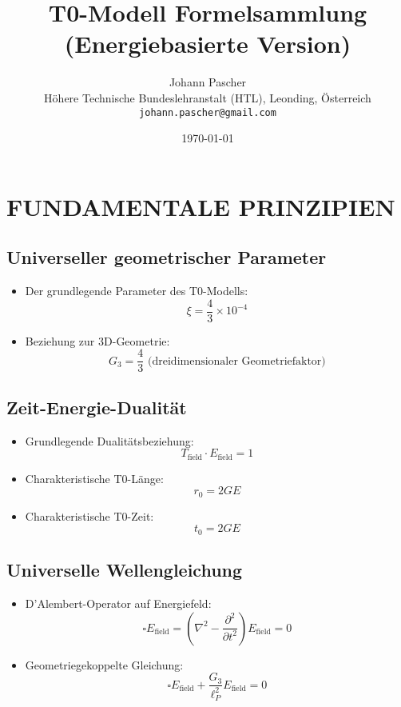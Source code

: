 \documentclass[12pt,a4paper]{article}
\title{T0-Modell Formelsammlung\\
	\large (Energiebasierte Version)}
\author{Johann Pascher\\
	\small H\"{o}here Technische Bundeslehranstalt (HTL), Leonding, \"{O}sterreich\\
	\small \texttt{johann.pascher@gmail.com}}
\date{\today}
\begin{document}
	
	\maketitle
	\tableofcontents
	\newpage
	
	\section{FUNDAMENTALE PRINZIPIEN}
	
	\subsection{Universeller geometrischer Parameter}
	\begin{itemize}
		\item Der grundlegende Parameter des T0-Modells:
		$$\xi = \frac{4}{3} \times 10^{-4}$$
		
		\item Beziehung zur 3D-Geometrie:
		$$G_3 = \frac{4}{3} \text{ (dreidimensionaler Geometriefaktor)}$$
	\end{itemize}
	
	\subsection{Zeit-Energie-Dualit\"{a}t}
	\begin{itemize}
		\item Grundlegende Dualit\"{a}tsbeziehung:
		$$T_{\text{field}} \cdot E_{\text{field}} = 1$$
		
		\item Charakteristische T0-L\"{a}nge:
		$$r_0 = 2GE$$
		
		\item Charakteristische T0-Zeit:
		$$t_0 = 2GE$$
	\end{itemize}
	
	\subsection{Universelle Wellengleichung}
	\begin{itemize}
		\item D'Alembert-Operator auf Energiefeld:
		$$\square E_{\text{field}} = \left(\nabla^2 - \frac{\partial^2}{\partial t^2}\right) E_{\text{field}} = 0$$
		
		\item Geometriegekoppelte Gleichung:
		$$\square E_{\text{field}} + \frac{G_3}{\ell_P^2} E_{\text{field}} = 0$$
	\end{itemize}
	
\end{document}
